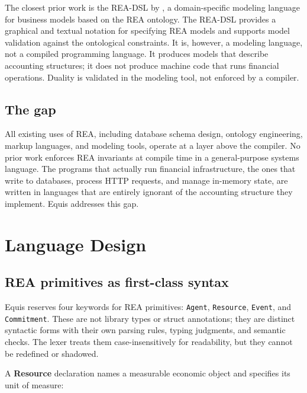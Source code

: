 \documentclass[11pt,a4paper]{article}
\theoremstyle{remark}
\begin{document}
The closest prior work is the REA-DSL by \citet{sonnenberg_rea-dsl_2011}, a
domain-specific modeling language for business models based on the REA
ontology. The REA-DSL provides a graphical and textual notation for
specifying REA models and supports model validation against the
ontological constraints. It is, however, a modeling language, not a
compiled programming language. It produces models that describe
accounting structures; it does not produce machine code that runs
financial operations. Duality is validated in the modeling tool, not
enforced by a compiler.

\subsection{The gap}

All existing uses of REA, including database schema design, ontology
engineering, markup languages, and modeling tools, operate at a layer
above the compiler. No prior work enforces REA invariants at compile
time in a general-purpose systems language. The programs that actually
run financial infrastructure, the ones that write to databases, process
HTTP requests, and manage in-memory state, are written in languages that
are entirely ignorant of the accounting structure they implement. Equis
addresses this gap.

\section{Language Design}\label{sec:design}

\subsection{REA primitives as first-class syntax}\label{sec:design:primitives}

Equis reserves four keywords for REA primitives: \texttt{Agent},
\texttt{Resource}, \texttt{Event}, and \texttt{Commitment}. These are
not library types or struct annotations; they are distinct syntactic
forms with their own parsing rules, typing judgments, and semantic
checks. The lexer treats them case-insensitively for readability, but
they cannot be redefined or shadowed.

A \textbf{Resource} declaration names a measurable economic object and
specifies its unit of measure:
\end{document}
